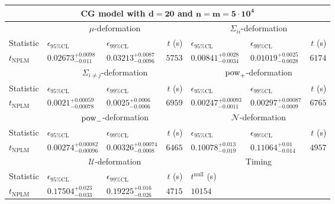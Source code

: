 \begin{tabular}{l|llr|llr}
	\toprule
	\multicolumn{7}{c}{{\bf CG model with $\mathbf{d=20}$ and $\mathbf{n=m=5\cdot 10^{4}}$}} \\
	\toprule
	\multicolumn{1}{c}{} & \multicolumn{3}{c}{$\mu$-deformation} & \multicolumn{3}{c}{$\Sigma_{ii}$-deformation} \\
	Statistic & $\epsilon_{95\%\mathrm{CL}}$ & $\epsilon_{99\%\mathrm{CL}}$ & $t$ (s) & $\epsilon_{95\%\mathrm{CL}}$ & $\epsilon_{99\%\mathrm{CL}}$ & $t$ (s) \\
	\midrule
	$t_{\mathrm{NPLM}}$ & $0.02673_{-0.011}^{+0.0098}$ & $0.03213_{-0.0096}^{+0.0087}$ & $5753$ & $0.00841_{-0.0034}^{+0.0028}$ & $0.01019_{-0.0028}^{+0.0025}$ & $6174$ \\
	\toprule
	\multicolumn{1}{c}{} & \multicolumn{3}{c}{$\Sigma_{i\neq j}$-deformation} & \multicolumn{3}{c}{$\rm{pow}_{+}$-deformation} \\
	Statistic & $\epsilon_{95\%\mathrm{CL}}$ & $\epsilon_{99\%\mathrm{CL}}$ & $t$ (s) & $\epsilon_{95\%\mathrm{CL}}$ & $\epsilon_{99\%\mathrm{CL}}$ & $t$ (s) \\
	\midrule
	$t_{\mathrm{NPLM}}$ & $0.0021_{-0.00078}^{+0.00059}$ & $0.0025_{-0.0006}^{+0.0006}$ & $6959$ & $0.00247_{-0.0011}^{+0.00093}$ & $0.00297_{-0.0009}^{+0.00087}$ & $6765$ \\
	\toprule
	\multicolumn{1}{c}{} & \multicolumn{3}{c}{$\rm{pow}_{-}$-deformation} & \multicolumn{3}{c}{$\mathcal{N}$-deformation} \\
	Statistic & $\epsilon_{95\%\mathrm{CL}}$ & $\epsilon_{99\%\mathrm{CL}}$ & $t$ (s) & $\epsilon_{95\%\mathrm{CL}}$ & $\epsilon_{99\%\mathrm{CL}}$ & $t$ (s) \\
	\midrule
	$t_{\mathrm{NPLM}}$ & $0.00274_{-0.00096}^{+0.00082}$ & $0.00326_{-0.0008}^{+0.00074}$ & $6465$ & $0.10078_{-0.019}^{+0.013}$ & $0.11064_{-0.014}^{+0.01}$ & $4957$ \\
	\toprule
	\multicolumn{1}{c}{} & \multicolumn{3}{c}{$\mathcal{U}$-deformation} & \multicolumn{3}{c}{Timing} \\
	Statistic & $\epsilon_{95\%\mathrm{CL}}$ & $\epsilon_{99\%\mathrm{CL}}$ & $t$ (s) & $t^{\mathrm{null}}$ (s) \\
	\midrule
	$t_{\mathrm{NPLM}}$ & $0.17504_{-0.033}^{+0.023}$ & $0.19225_{-0.026}^{+0.016}$ & $4715$ & $10154$ \\
	\bottomrule
\end{tabular}